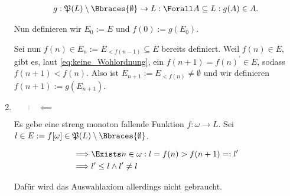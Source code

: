 \begin{solution}
\begin{enumerate}[label = \texttt{ad}]
    \begin{align*}
        g:
        \mathfrak{P}(L) \setminus \Bbraces{\emptyset} \to L:
            \Forall A \subseteq L:
                g(A) \in A.
    \end{align*}

    Nun definieren wir $E_0 := E$ und $f(0) := g(E_0)$.

    Sei nun $f(n) \in E_{n} := E_{< f(n-1)} \subseteq E$ bereits definiert.
    Weil $f(n) \in E$, gibt es, laut \eqref{eq:keine_Wohlordnung}, ein $f(n + 1) = f(n)^\prime \in E$, sodass $f(n + 1) < f(n)$.
    Also ist $E_{n+1} := E_{<f(n)} \neq \emptyset$ und wir definieren $f(n+1) := g(E_{n+1})$.

    \item \blockquote{$\impliedby$}:

    Es gebe eine streng monoton fallende Funktion $f: \omega \to L$.
    Sei $l \in E := f[\omega] \in \mathfrak{P}(L) \setminus \Bbraces{\emptyset}$.

    \begin{align*}
        \implies &
        \Exists n \in \omega:
            l = f(n) > f(n + 1) =: l^\prime \\
        \implies &
        l^\prime \leq l \land l^\prime \neq l
    \end{align*}

    Dafür wird das Auswahlaxiom allerdings nicht gebraucht.

\end{enumerate}

\end{solution}

